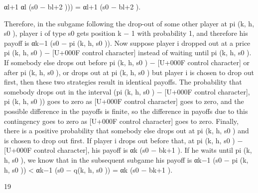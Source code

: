 \documentclass[10pt]{article}
\begin{document}
\begin{ReviewVerbatim}
αl+1
αl (s0 − bl+2 ))) = αl+1 (s0 − bl+2 ).

Therefore, in the subgame following the drop-out of some other player at pi (k, h, s0 ), player i
of type s0 gets position k − 1 with probability 1, and therefore his payoff is αk−1 (s0 − pi (k, h, s0 )).
Now suppose player i dropped out at a price pi (k, h, s0 ) − [U+000F control character] instead of waiting until pi (k, h, s0 ).
If somebody else drops out before pi (k, h, s0 ) − [U+000F control character] or after pi (k, h, s0 ), or drops out at pi (k, h, s0 )
but player i is chosen to drop out first, then these two strategies result in identical payoffs. The
probability that somebody drops out in the interval (pi (k, h, s0 ) − [U+000F control character], pi (k, h, s0 )) goes to zero as [U+000F control character]
goes to zero, and the possible difference in the payoffs is finite, so the difference in payoffs due
to this contingency goes to zero as [U+000F control character] goes to zero. Finally, there is a positive probability that
somebody else drops out at pi (k, h, s0 ) and is chosen to drop out first. If player i drops out before
that, at pi (k, h, s0 ) − [U+000F control character], his payoff is αk (s0 − bk+1 ). If he waits until pi (k, h, s0 ), we know that in the
subsequent subgame his payoff is αk−1 (s0 − pi (k, h, s0 )) < αk−1 (s0 − q(k, h, s0 )) = αk (s0 − bk+1 ).

19



\end{ReviewVerbatim}
\end{document}
